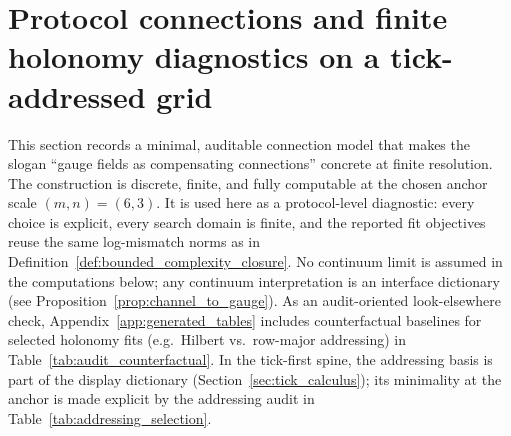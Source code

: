 \section{Protocol connections and finite holonomy diagnostics on a tick-addressed grid}
\label{sec:protocol_connections_holonomy}

This section records a minimal, auditable connection model that makes the slogan ``gauge fields as compensating connections'' concrete at finite resolution.
The construction is discrete, finite, and fully computable at the chosen anchor scale $(m,n)=(6,3)$.
It is used here as a protocol-level diagnostic: every choice is explicit, every search domain is finite, and the reported fit objectives reuse the same log-mismatch norms as in Definition~\ref{def:bounded_complexity_closure}.
No continuum limit is assumed in the computations below; any continuum interpretation is an interface dictionary (see Proposition~\ref{prop:channel_to_gauge}).
As an audit-oriented look-elsewhere check, Appendix~\ref{app:generated_tables} includes counterfactual baselines for selected holonomy fits (e.g.\ Hilbert vs.\ row-major addressing) in Table~\ref{tab:audit_counterfactual}.
In the tick-first spine, the addressing basis is part of the display dictionary (Section~\ref{sec:tick_calculus}); its minimality at the anchor is made explicit by the addressing audit in Table~\ref{tab:addressing_selection}.

\begin{center}
\end{center}

